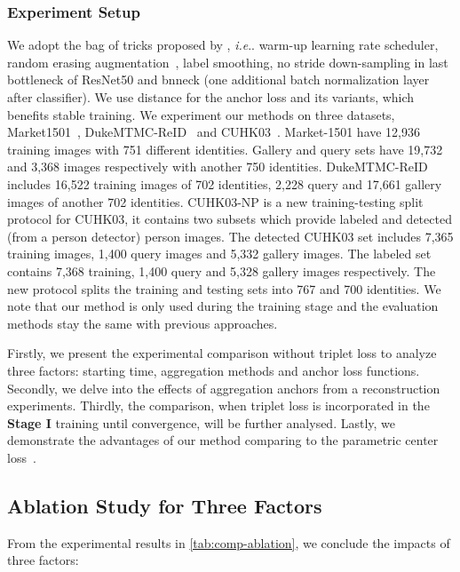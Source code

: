 \documentclass[runningheads]{llncs}
\makeatletter
\DeclareRobustCommand\onedot{\futurelet\@let@token\@onedot}
\def\@onedot{\ifx\@let@token.\else.\null\fi\xspace}
\def\ie{\emph{i.e}\onedot} \def\Ie{\emph{I.e}\onedot}
\makeatother
\begin{document}
\subsubsection{Experiment Setup}
We adopt the bag of tricks proposed by \cite{luo-bnneck}, \ie warm-up learning rate scheduler, random erasing augmentation~\cite{zhong2017random}, label smoothing, no stride down-sampling in last bottleneck of ResNet50 and bnneck (one additional batch normalization layer after classifier).
We use  distance for the anchor loss and its variants, which benefits stable training.
We experiment our methods on three datasets, Market1501~\cite{zheng-market}, DukeMTMC-ReID~\cite{ristani-dukemtmc} and CUHK03~\cite{li-cuhk}. Market-1501 have 12,936 training images with 751 different identities. Gallery and query sets have 19,732 and 3,368 images respectively with another 750 identities. DukeMTMC-ReID includes 16,522 training images of 702 identities, 2,228 query and 17,661 gallery images of another 702 identities. CUHK03-NP is a new training-testing split protocol for CUHK03, it contains two subsets which provide labeled and detected (from a person detector) person images. The detected CUHK03 set includes 7,365 training images, 1,400 query images and 5,332 gallery images. The labeled set contains 7,368 training, 1,400 query and 5,328 gallery images respectively. The new protocol splits the training and testing sets into 767 and 700 identities. We note that our method is only used during the training stage and the evaluation methods stay the same with previous approaches.

Firstly, we present the experimental comparison without triplet loss to analyze three factors: starting time, aggregation methods and anchor loss functions. 
Secondly, we delve into the effects of aggregation anchors from a reconstruction experiments.
Thirdly, the comparison, when triplet loss is incorporated in the \textbf{Stage I} training until convergence, will be further analysed.
Lastly, we demonstrate the advantages of our method comparing to the parametric center loss~\cite{wen-centerloss}.

\vspace*{-0.18cm}
\subsection{Ablation Study for Three Factors}\label{sec:ablation}

From the experimental results in \cref{tab:comp-ablation}, we conclude the impacts of three factors:
\end{document}

